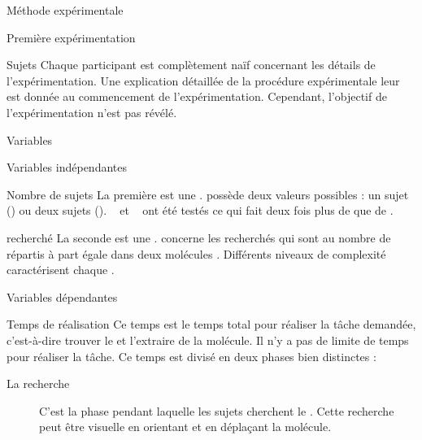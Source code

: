 \documentclass[myfrancais]{mythesis}
\begin{document}
\begin{mychapter}{Méthode expérimentale}
\begin{mysection}{Première expérimentation}
\begin{mysubsection}{Sujets}
				Chaque participant est complètement naïf concernant les détails de l'expérimentation.
				Une explication détaillée de la procédure expérimentale leur est donnée au commencement de l'expérimentation.
				Cependant, l'objectif de l'expérimentation n'est pas révélé.
			\end{mysubsection}
			\begin{mysubsection}{Variables}
				\begin{mysubsubsection}{Variables indépendantes}
					\begin{myparagraph}{ Nombre de sujets}
						La première  est une .
						 possède deux valeurs possibles : \og un sujet \fg (\mycf {}) ou \og deux sujets \fg (\mycf {}).
						~ et ~ ont été testés ce qui fait deux fois plus de  que de .
					\end{myparagraph}
					\begin{myparagraph}{  recherché}
						La seconde  est une .
						 concerne les  recherchés qui sont au nombre de  répartis à part égale dans deux molécules .
						Différents niveaux de complexité caractérisent chaque  .
					\end{myparagraph}
				\end{mysubsubsection}
				\begin{mysubsubsection}{Variables dépendantes}
					\begin{myparagraph}{ Temps de réalisation}
						Ce temps est le temps total pour réaliser la tâche demandée, c'est-à-dire trouver le  et l'extraire de la molécule.
						Il n'y a pas de limite de temps pour réaliser la tâche.
						Ce temps est divisé en deux phases bien distinctes :
						\begin{description}
							\item[La recherche] C'est la phase pendant laquelle les sujets cherchent le .
								Cette recherche peut être visuelle en orientant et en déplaçant la molécule.

\end{description}
\end{myparagraph}
\end{mysubsubsection}
\end{mysubsection}
\end{mysection}
\end{mychapter}
\end{document}
